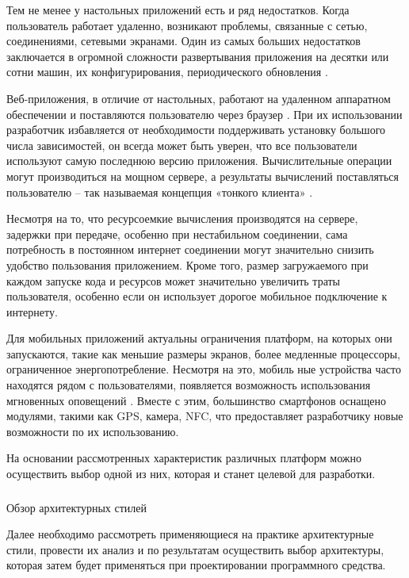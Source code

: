 Тем не менее у настольных приложений есть и ряд недостатков. Когда пользователь работает удаленно, возникают проблемы,
связанные с сетью, соединениями, сетевыми экранами. Один из самых больших недостатков заключается в огромной
сложности развертывания приложения на десятки или сотни машин, их конфигурирования, периодического обновления \cite{msdn_desktop_vs_web}.

Веб-приложения, в отличие от настольных, работают на удаленном аппаратном обеспечении и поставляются пользователю
через браузер \cite{web_based_vs_desktop}. При их использовании разработчик избавляется от необходимости поддерживать
установку большого числа зависимостей, он всегда может быть уверен, что все пользователи используют самую последнюю
версию приложения. Вычислительные операции могут производиться на мощном сервере, а результаты вычислений поставляться
пользователю – так называемая концепция «тонкого клиента» \cite{desktop_vs_web_deeper_look}.

Несмотря на то, что ресурсоемкие вычисления производятся на сервере, задержки при передаче, особенно при нестабильном
соединении, сама потребность в постоянном интернет соединении могут значительно снизить удобство пользования
приложением. Кроме того, размер загружаемого при каждом запуске кода и ресурсов может значительно увеличить траты
пользователя, особенно если он использует дорогое мобильное подключение к интернету.

Для мобильных приложений актуальны ограничения платформ, на которых они запускаются, такие как меньшие размеры
экранов, более медленные процессоры, ограниченное энергопотребление. Несмотря на это, мобиль ные устройства часто
находятся рядом с пользователями, появляется возможность использования мгновенных оповещений \cite{desktop_mobile_differences}.
Вместе с этим, большинство смартфонов оснащено модулями, такими как GPS, камера, NFC, что предоставляет разработчику
новые возможности по их использованию.

На основании рассмотренных характеристик различных платформ можно осуществить выбор одной из них, которая и станет
целевой для разработки.

\subsubsection{} Обзор архитектурных стилей
\label{sec:analysis:literature:architecture}

Далее необходимо рассмотреть применяющиеся на практике архитектурные стили, провести их анализ и по результатам
осуществить выбор архитектуры, которая затем будет применяться при проектировании программного средства.

